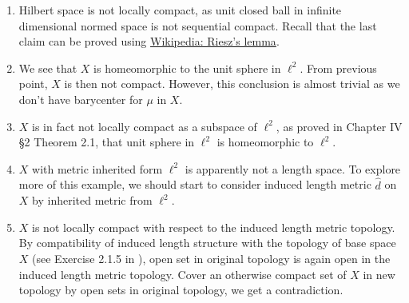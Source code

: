 \begin{rmk}
	\begin{enumerate}
		\item Hilbert space is not locally compact, as unit closed ball in infinite dimensional normed space is not sequential compact. Recall that the last claim can be proved using \href{https://en.wikipedia.org/wiki/Riesz%27s_lemma}{Wikipedia: Riesz's lemma}.
		\item %
		      We see that $X$ is homeomorphic to the unit sphere in $\ell^2$. From previous point, $X$ is then not compact. However, this conclusion is almost trivial as we don't have barycenter for $\mu$ in $X$.
		\item $X$ is in fact not locally compact as a subspace of $\ell^2$, as proved in \cite{bessaga1975selected} Chapter IV §2 Theorem 2.1, that unit sphere in $\ell^2$ is homeomorphic to $\ell^2$.
		\item $X$ with metric inherited form $\ell^2$ is apparently not a length space. To explore more of this example, we should start to consider induced length metric $\hat{d}$ on $X$ by inherited metric from $\ell^2$.
		\item $X$ is not locally compact with respect to the induced length metric topology. By compatibility of induced length structure with the topology of base space $X$ (see Exercise 2.1.5 in \cite{burago2001course}), open set in original topology is again open in the induced length metric topology. Cover an otherwise compact set of $X$ in new topology by open sets in original topology, we get a contradiction.

\end{enumerate}
\end{rmk}
